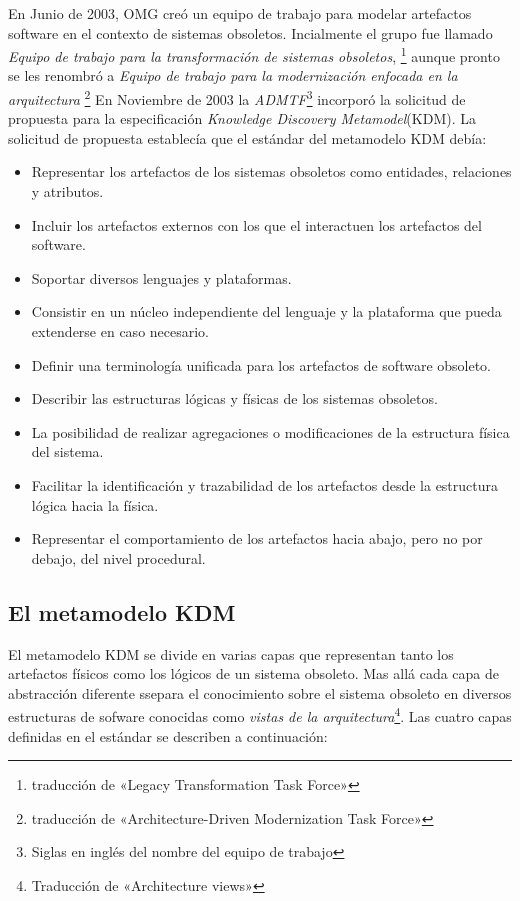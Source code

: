 {En Junio de 2003, OMG\cite{OMG} creó un equipo de trabajo para modelar artefactos software en el contexto de sistemas obsoletos. Incialmente el grupo fue llamado \textit{Equipo de trabajo para la transformación de sistemas obsoletos},
\footnote{traducción de «Legacy Transformation Task Force»} aunque pronto se les renombró a \textit{Equipo de trabajo para la modernización enfocada en la arquitectura} \footnote{traducción de «Architecture-Driven Modernization Task Force»} 
En Noviembre de 2003 la \textit{ADMTF}\footnote{Siglas en inglés del nombre del equipo de trabajo} incorporó la solicitud de propuesta para la especificación \textit{Knowledge Discovery Metamodel}(KDM).
La solicitud de propuesta establecía que el estándar del metamodelo KDM debía:
\begin{itemize}
 \item Representar los artefactos de los sistemas obsoletos como entidades, relaciones y atributos.
 \item Incluir los artefactos externos con los que el interactuen los artefactos del software.
 \item Soportar diversos lenguajes y plataformas.
 \item Consistir en un núcleo independiente del lenguaje y la plataforma que pueda extenderse en caso necesario.
 \item Definir una terminología unificada para los artefactos de software obsoleto.
 \item Describir las estructuras lógicas y físicas de los sistemas obsoletos.
 \item La posibilidad de realizar agregaciones o modificaciones de la estructura física del sistema.
 \item Facilitar la identificación y trazabilidad de los artefactos desde la estructura lógica hacia la física.
 \item Representar el comportamiento de los artefactos hacia abajo, pero no por debajo, del nivel procedural.
\end{itemize}
\cite{KDM}

\subsection{El metamodelo KDM}\label{sec:KDM-metamodel}

El metamodelo KDM se divide en varias capas que representan tanto los artefactos físicos como los lógicos de un sistema obsoleto. Mas allá cada capa de 
abstracción diferente ssepara el conocimiento sobre el sistema obsoleto en diversos estructuras de sofware conocidas como \textit{vistas de la arquitectura}\footnote{Traducción de «Architecture views»}.
Las cuatro capas definidas en el estándar se describen a continuación:

}
